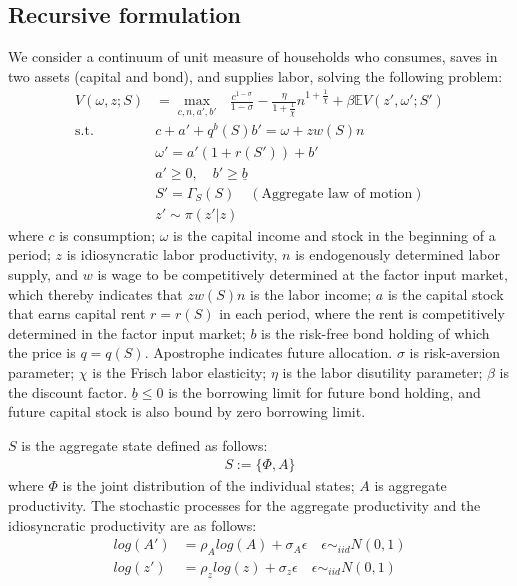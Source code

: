 \subsection*{Recursive formulation}
We consider a continuum of unit measure of households who consumes, saves in two assets (capital and bond), and supplies labor, solving the following problem:
\begin{align*}
  V(\omega,z;S) &= \max_{c,n,a',b'}\text{ } \frac{c^{1-\sigma}}{1-\sigma} -\frac{\eta}{1+\frac{1}{\chi}} n^{1+\frac{1}{\chi}}+ \beta \mathbb{E}V(z',\omega';S')
  \\
  \text{s.t. }& 
  c + a' + q^{b}(S)b' =  \omega  + zw(S)n
  \\
  &
  \omega' = a'(1+r(S')) + b'
  \\
  &a'\geq 0,\quad b'\geq \underline{b}
  \\
  & S' = \Gamma_{S}(S) \quad(\text{Aggregate law of motion})
  \\
  & z' \sim \pi(z'|z)
\end{align*} 
where %
$c$ is consumption;
$\omega$ is the capital income and stock in the beginning of a period; $z$ is idiosyncratic labor productivity, $n$ is endogenously determined labor supply, and $w$ is wage to be competitively determined at the factor input market, which thereby indicates that $zw(S)n$ is the labor income; $a$ is the capital stock that earns capital rent $r=r(S)$ in each period, where the rent is competitively determined in the factor input market; $b$ is the risk-free bond holding of which the price is $q=q(S)$. Apostrophe indicates future allocation. 
$\sigma$ is risk-aversion parameter; $\chi$ is the Frisch labor elasticity; $\eta$ is the labor disutility parameter; $\beta$ is the discount factor. $\underline{b}\leq0$ is the borrowing limit for future bond holding, and future capital stock is also bound by zero borrowing limit.

$S$ is the aggregate state defined as follows:
\begin{align*}
  S := \{\Phi,A\}
\end{align*}
where $\Phi$ is the joint distribution of the individual states; $A$ is aggregate productivity. The stochastic processes for the aggregate productivity and the idiosyncratic productivity are as follows:
\begin{align*}
  log(A') &= \rho_{A}log(A) + \sigma_{A}\epsilon\quad \epsilon\sim_{iid} N(0,1)
  \\
  log(z') &= \rho_{z}log(z) + \sigma_{z}\epsilon\quad \epsilon\sim_{iid} N(0,1)
\end{align*}

